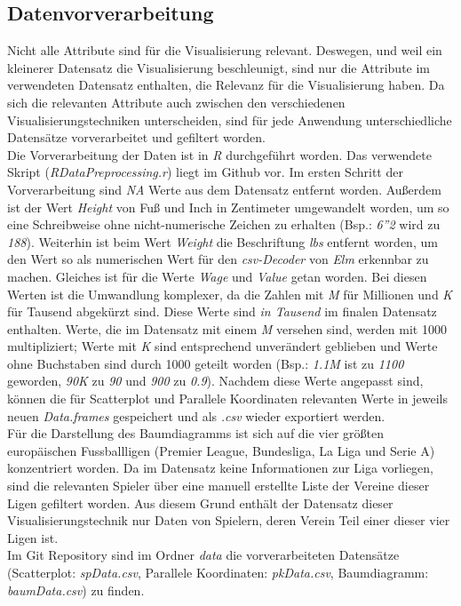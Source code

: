 \documentclass[usegeometry=true]{scrartcl}
\begin{document}
\subsection{\label{Datenvorverarbeitung}Datenvorverarbeitung}
Nicht alle Attribute sind für die Visualisierung relevant. Deswegen, und weil ein kleinerer Datensatz die Visualisierung beschleunigt, sind nur die Attribute im verwendeten Datensatz enthalten, die Relevanz für die Visualisierung haben. Da sich die relevanten Attribute auch zwischen den verschiedenen Visualisierungstechniken unterscheiden, sind für jede Anwendung unterschiedliche Datensätze vorverarbeitet und gefiltert worden.\\
Die Vorverarbeitung der Daten ist in \textit{R} durchgeführt worden. Das verwendete Skript (\textit{RDataPreprocessing.r}) liegt im Github vor.
Im ersten Schritt der Vorverarbeitung sind \textit{NA} Werte aus dem Datensatz entfernt worden.
Außerdem ist der Wert \textit{Height} von Fuß und Inch in Zentimeter umgewandelt worden, um so eine Schreibweise ohne nicht-numerische Zeichen zu erhalten (Bsp.: \textit{6''2} wird zu \textit{188}). Weiterhin ist beim Wert \textit{Weight} die Beschriftung \textit{lbs} entfernt worden, um den Wert so als numerischen Wert für den \textit{csv-Decoder} von \textit{Elm} erkennbar zu machen.
Gleiches ist für die Werte \textit{Wage} und \textit{Value} getan worden. Bei diesen Werten ist die Umwandlung komplexer, da die Zahlen mit \textit{M} für Millionen und \textit{K} für Tausend abgekürzt sind.
Diese Werte sind \textit{in Tausend} im finalen Datensatz enthalten. Werte, die im Datensatz mit einem \textit{M} versehen sind, werden mit 1000 multipliziert; Werte mit \textit{K} sind entsprechend unverändert geblieben und Werte ohne Buchstaben sind durch 1000 geteilt worden (Bsp.: \textit{1.1M} ist zu \textit{1100} geworden, \textit{90K} zu \textit{90} und \textit{900} zu \textit{0.9}).
Nachdem diese Werte angepasst sind, können die für Scatterplot und Parallele Koordinaten relevanten Werte in jeweils neuen \textit{Data.frames} gespeichert und als \textit{.csv} wieder exportiert werden.\\
Für die Darstellung des Baumdiagramms ist sich auf die vier größten europäischen Fussballligen (Premier League, Bundesliga, La Liga und Serie A) konzentriert worden. Da im Datensatz keine Informationen zur Liga vorliegen, sind die relevanten Spieler über eine manuell erstellte Liste der Vereine dieser Ligen gefiltert worden. Aus diesem Grund enthält der Datensatz dieser Visualisierungstechnik nur Daten von Spielern, deren Verein Teil einer dieser vier Ligen ist.\\
Im Git Repository sind im Ordner \textit{data} die vorverarbeiteten Datensätze (Scatterplot: \textit{spData.csv}, Parallele Koordinaten: \textit{pkData.csv}, Baumdiagramm: \textit{baumData.csv}) zu finden.
\end{document}
